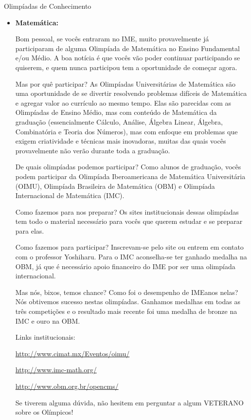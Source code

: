 \begin{subsecao}{Olimpíadas de Conhecimento}

\begin{itemize}

\item{\bf Matemática: }

Bom pessoal, se vocês entraram no IME, muito provavelmente já participaram
de alguma Olimpíada de Matemática no Ensino Fundamental e/ou Médio. A 
boa notícia é que vocês vão poder continuar participando se quiserem,
e quem nunca participou tem a oportunidade de começar agora.

Mas por quê participar? As Olimpíadas Universitárias de Matemática são uma
oportunidade de se divertir resolvendo problemas difíceis de Matemática e agregar
valor ao currículo ao mesmo tempo. Elas são parecidas com as Olimpíadas de
Ensino Médio, mas com conteúdo de Matemática da graduação (essencialmente 
Cálculo, Análise, Álgebra Linear, Álgebra, Combinatória e Teoria dos Números), 
mas com enfoque em problemas que exigem criatividade e técnicas mais inovadoras,
muitas das quais vocês provavelmente não verão durante toda a graduação.

De quais olimpíadas podemos participar? Como alunos de graduação, vocês podem
participar da Olimpíada Iberoamericana de Matemática Universitária (OIMU),
Olimpíada Brasileira de Matemática (OBM) e Olimpíada Internacional de 
Matemática (IMC).

Como fazemos para nos preparar? Os sites institucionais dessas olimpíadas
tem todo o material necessário para vocês que querem estudar e se preparar
para elas.

Como fazemos para participar? Inscrevam-se pelo site ou entrem em contato com
o professor Yoshiharu. Para o IMC aconselha-se ter ganhado medalha na OBM,
já que é necessário apoio financeiro do IME por ser uma olimpíada internacional.

Mas nós, bixos, temos chance? Como foi o desempenho de IMEanos nelas? Nós
obtivemos sucesso nestas olimpíadas. Ganhamos medalhas em todas as três
competições e o resultado mais recente foi uma medalha de bronze na IMC e ouro
na OBM.

Links institucionais:

\url{http://www.cimat.mx/Eventos/oimu/}

\url{http://www.imc-math.org/}

\url{http://www.obm.org.br/opencms/}

Se tiverem alguma dúvida, não hesitem em perguntar a algum VETERANO sobre os
Olímpicos!


\end{itemize}
\end{subsecao}
